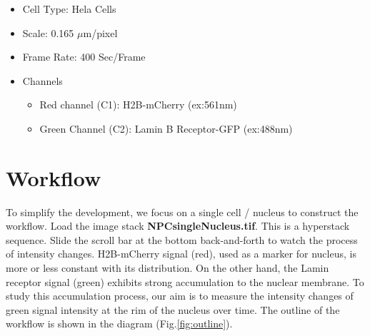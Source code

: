 \begin{itemize}
\item Cell Type: Hela Cells
\item Scale: 0.165 $\mu$m/pixel
\item Frame Rate: 400 Sec/Frame
\item Channels
\begin{itemize}
    \item Red channel (C1): H2B-mCherry (ex:561nm)
	\item Green Channel (C2): Lamin B Receptor-GFP (ex:488nm)
 
\end{itemize}
\end{itemize}

\section{Workflow}





To simplify the development, we focus on a single cell / nucleus to construct the workflow. Load the image stack \textbf{NPCsingleNucleus.tif}. This is a hyperstack sequence. Slide the scroll bar at the bottom back-and-forth to watch the process of intensity changes. H2B-mCherry signal (red), used as a marker for nucleus, is more or less constant with its distribution. On the other hand, the Lamin receptor signal (green) exhibits strong accumulation to the nuclear membrane. To study this accumulation process, our aim is to measure the intensity changes of green signal intensity at the rim of the nucleus over time. The outline of the workflow is shown in the diagram (Fig.\ref{fig:outline}). 

